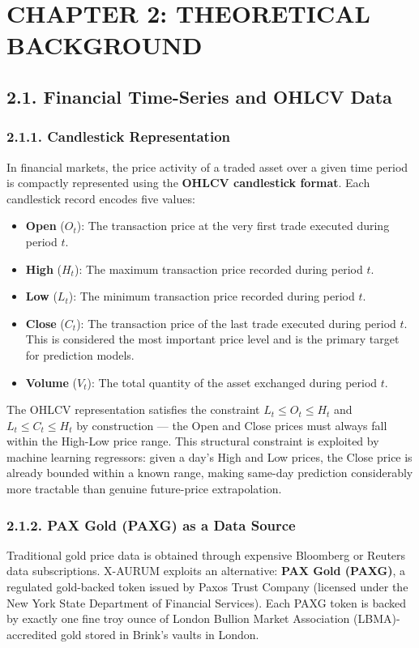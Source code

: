 \section{CHAPTER 2: THEORETICAL BACKGROUND}

\subsection{2.1. Financial Time-Series and OHLCV Data}

\subsubsection{2.1.1. Candlestick Representation}
In financial markets, the price activity of a traded asset over a given time period is compactly represented using the \textbf{OHLCV candlestick format}. Each candlestick record encodes five values:

\begin{itemize}
  \item \textbf{Open} ($O_t$): The transaction price at the very first trade executed during period $t$.
  \item \textbf{High} ($H_t$): The maximum transaction price recorded during period $t$.
  \item \textbf{Low} ($L_t$): The minimum transaction price recorded during period $t$.
  \item \textbf{Close} ($C_t$): The transaction price of the last trade executed during period $t$. This is considered the most important price level and is the primary target for prediction models.
  \item \textbf{Volume} ($V_t$): The total quantity of the asset exchanged during period $t$.
\end{itemize}

The OHLCV representation satisfies the constraint $L_t \leq O_t \leq H_t$ and $L_t \leq C_t \leq H_t$ by construction --- the Open and Close prices must always fall within the High-Low price range. This structural constraint is exploited by machine learning regressors: given a day's High and Low prices, the Close price is already bounded within a known range, making same-day prediction considerably more tractable than genuine future-price extrapolation.

\subsubsection{2.1.2. PAX Gold (PAXG) as a Data Source}
Traditional gold price data is obtained through expensive Bloomberg or Reuters data subscriptions. X-AURUM exploits an alternative: \textbf{PAX Gold (PAXG)}, a regulated gold-backed token issued by Paxos Trust Company (licensed under the New York State Department of Financial Services). Each PAXG token is backed by exactly one fine troy ounce of London Bullion Market Association (LBMA)-accredited gold stored in Brink's vaults in London.

